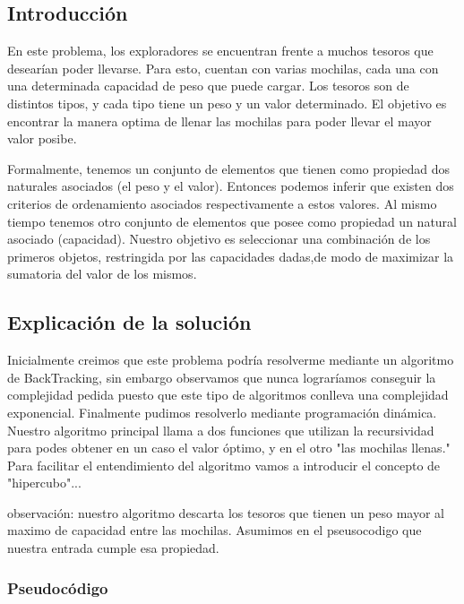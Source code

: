 \documentclass[spanish,12pt]{article}
\begin{document}
\subsection{Introducción}

En este problema, los exploradores se encuentran frente a muchos tesoros que desearían poder llevarse. Para esto, cuentan con varias mochilas, cada una con una determinada capacidad de peso que puede cargar.
Los tesoros son de distintos tipos, y cada tipo tiene un peso y un valor determinado.
El objetivo es encontrar la manera optima de llenar las mochilas para poder llevar el mayor valor posibe.

Formalmente, tenemos un conjunto de elementos que tienen como propiedad dos naturales asociados (el peso y el valor). Entonces podemos inferir que existen dos criterios de ordenamiento asociados respectivamente a estos valores.
Al mismo tiempo tenemos otro conjunto de elementos que posee como propiedad un natural asociado (capacidad).
Nuestro objetivo es seleccionar una combinación de los primeros objetos, restringida por las capacidades dadas,de modo de maximizar la sumatoria del valor de los mismos.


\subsection{Explicación de la solución}

   Inicialmente creimos que este problema podría resolverme mediante un algoritmo de BackTracking, sin embargo observamos que nunca lograríamos conseguir la complejidad pedida puesto que este tipo de algoritmos conlleva una complejidad exponencial.
   Finalmente pudimos resolverlo mediante programación dinámica. Nuestro algoritmo principal llama a dos funciones que utilizan la recursividad para podes obtener en un caso el valor óptimo, y en el otro "las mochilas llenas."
   Para facilitar el entendimiento del algoritmo vamos a introducir el concepto de "hipercubo"...%



observación: nuestro algoritmo descarta los tesoros que tienen un peso mayor al maximo de capacidad entre las mochilas. Asumimos en el pseusocodigo que nuestra entrada cumple esa propiedad.


\subsubsection{Pseudocódigo}
\end{document}
